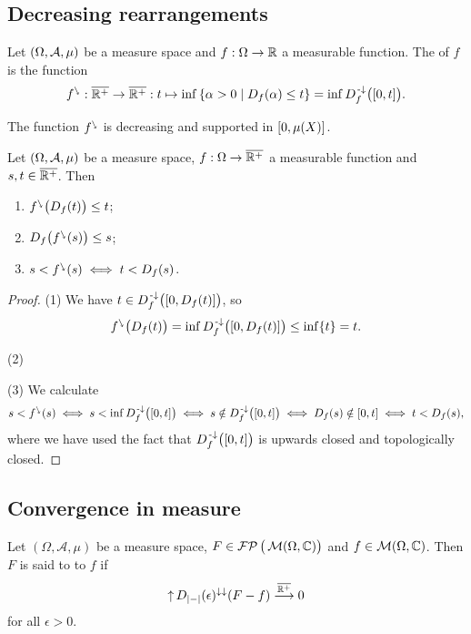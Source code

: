 \subsection{Decreasing rearrangements}
\begin{definition}
Let $\sSet{\Omega, \mathcal{A}, \mu}$ be a measure space and $f: \Omega\to \mathbb{R}$ a measurable function. The  of $f$ is the function
\[ \decRearrange{f}: \overline{\R^+}\to \overline{\R^+}: t \mapsto \inf\setbuilder{\alpha > 0}{D_f(\alpha)\leq t} = \inf D_f^{\preimf}\big(\interval{0,t}\big).  \]
\end{definition}

The function ${f}^{\ssearrow}$ is decreasing and supported in $\interval[c]{0,\mu(X)}$.



\begin{proposition}
Let $\sSet{\Omega, \mathcal{A}, \mu}$ be a measure space, $f: \Omega\to \overline{\mathbb{R}^+}$ a measurable function and $s,t\in \overline{\mathbb{R}^+}$. Then
\begin{enumerate}
\item ${f}^{\ssearrow}\big(D_f(t)\big) \leq t$;
\item $D_f\big({f}^{\ssearrow}(s)\big) \leq s$;
\item $s < {f}^{\ssearrow}(s) \iff t < D_f(s)$.
\end{enumerate}
\end{proposition}
\begin{proof}
(1) We have $t\in D_f^\preimf\big(\interval{0,D_f(t)}\big)$, so
\[ \decRearrange{f}\big(D_f(t)\big) = \inf D_f^\preimf\big(\interval{0,D_f(t)}\big)\leq \inf\{t\} = t. \]

(2)

(3) We calculate
\[ s < \decRearrange{f}(s) \iff s< \inf D_f^{\preimf}\big(\interval{0,t}\big) \iff s\notin D_f^{\preimf}\big(\interval{0,t}\big) \iff D_f(s) \notin \interval{0,t} \iff t < D_f(s), \]
where we have used the fact that $D_f^{\preimf}\big(\interval{0,t}\big)$ is upwards closed and topologically closed.
\end{proof}


\subsection{Convergence in measure}
\begin{definition}
Let $(\Omega, \mathcal{A}, \mu)$ be a measure space, $F\in \operatorname{\mathcal{FP}}\big(\operatorname{\mathcal{M}}(\Omega, \mathbb{C})\big)$ and $f\in \operatorname{\mathcal{M}}(\Omega, \mathbb{C})$. Then $F$ is said to  to $f$ if
\[ \operatorname{\uparrow} D_{|-|}(\epsilon)^{\downarrow\downarrow}(F-f) \overset{\overline{\mathbb{R}^+}}{\longrightarrow} 0 \]
for all $\epsilon > 0$.
\end{definition}

